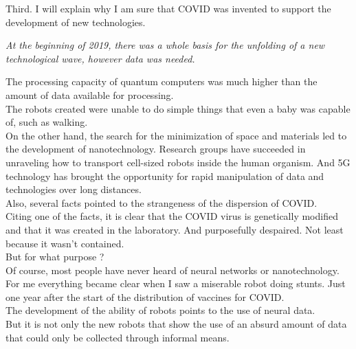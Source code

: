 \documentclass[11pt]{book}
\begin{document}
\noindent Third. I will explain why I am sure that COVID was invented to support the development of new technologies.

\noindent \begin{center} \emph{At the beginning of 2019, there was a whole basis for the unfolding of a new technological wave, however data was needed.} \end{center}

\noindent The processing capacity of quantum computers was much higher than the amount of data available for processing. \\

\noindent The robots created were unable to do simple things that even a baby was capable of, such as walking. \\

\noindent On the other hand, the search for the minimization of space and materials led to the development of nanotechnology. Research groups have succeeded in unraveling how to transport cell-sized robots inside the human organism. And 5G technology has brought the opportunity for rapid manipulation of data and technologies over long distances. \\

\noindent Also, several facts pointed to the strangeness of the dispersion of COVID. \\

\noindent Citing one of the facts, it is clear that the COVID virus is genetically modified and that it was created in the laboratory. And purposefully despaired. Not least because it wasn't contained. \\

\noindent But for what purpose ? \\

\noindent Of course, most people have never heard of neural networks or nanotechnology. \\

\noindent For me everything became clear when I saw a miserable robot doing stunts. Just one year after the start of the distribution of vaccines for COVID. \\

\noindent The development of the ability of robots points to the use of neural data. \\

\noindent But it is not only the new robots that show the use of an absurd amount of data that could only be collected through informal means. \\
\end{document}
